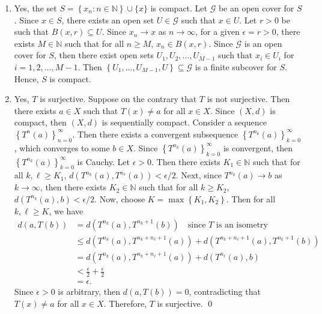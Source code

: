 \documentclass[11pt]{amsart}
\theoremstyle{plain}
\numberwithin{equation}{section}
\begin{document}
\begin{enumerate}[label=\textbf{(\alph*)}]
    \itemsep 0em
    \item Yes, the set $S=\left\{x_{n}:n\in\mathbb{N}\right\}\cup\{x\}$ is compact. Let $\mathcal{G}$ be an open cover for $S$. Since $x\in S$, there exists an open set $U\in\mathcal{G}$ such that $x\in U$. Let $r>0$ be such that $B(x,r)\subseteq U$. Since $x_{n}\to x$ as $n\to\infty$, for a given $\epsilon=r>0$, there exists $M\in\mathbb{N}$ such that for all $n\geq M$, $x_{n}\in B\left(x,r\right)$. Since $\mathcal{G}$ is an open cover for $S$, then there exist open sets $U_{1},U_{2},\dots,U_{M-1}$ such that $x_{i}\in U_{i}$ for $i=1,2,\dots,M-1$. Then $\left\{U_{1},\dots,U_{M-1},U\right\}\subseteq\mathcal{G}$ is a finite subcover for $S$. Hence, $S$ is compact.
    \item Yes, $T$ is surjective. Suppose on the contrary that $T$ is not surjective. Then there exists $a\in X$ such that $T(x)\neq a$ for all $x\in X$. Since $(X,d)$ is compact, then $(X,d)$ is sequentially compact. Consider a sequence $\left\{T^{n}(a)\right\}_{n=0}^{\infty}$. Then there exists a convergent subsequence $\left\{T^{n_{k}}(a)\right\}_{k=0}^{\infty}$, which converges to some $b\in X$. Since $\left\{T^{n_{k}}(a)\right\}_{k=0}^{\infty}$ is convergent, then $\left\{T^{n_{k}}(a)\right\}_{k=0}^{\infty}$ is Cauchy. Let $\epsilon>0$. Then there exists $K_{1}\in\mathbb{N}$ such that for all $k,\ell\geq K_{1}$, $d\left(T^{n_{k}}(a),T^{n_{\ell}}(a)\right)<\epsilon/2$. Next, since $T^{n_{k}}(a)\to b$ as $k\to\infty$, then there exists $K_{2}\in\mathbb{N}$ such that for all $k\geq K_{2}$, $d\left(T^{n_{k}}(a),b\right)<\epsilon/2$. Now, choose $K=\max\left\{K_{1},K_{2}\right\}$. Then for all $k,\ell\geq K$, we have
\begin{align*}
    d\left(a,T(b)\right)&=d\left(T^{n_{k}}(a),T^{n_{k}+1}(b)\right)\quad\text{since }T\text{ is an isometry}
    \\
    &\leq d\left(T^{n_{k}}(a),T^{n_{k}+n_{\ell}+1}(a)\right)+d\left(T^{n_{k}+n_{\ell}+1}(a),T^{n_{k}+1}(b)\right)
    \\
    &=d\left(T^{n_{k}}(a),T^{n_{k}+n_{\ell}+1}(a)\right)+d\left(T^{n_{\ell}}(a),b\right)
    \\
    &<\frac{\epsilon}{2}+\frac{\epsilon}{2}
    \\
    &=\epsilon.
\end{align*}
Since $\epsilon>0$ is arbitrary, then $d\left(a,T(b)\right)=0$, contradicting that $T(x)\neq a$ for all $x\in X$. Therefore, $T$ is surjective. \qed 
\end{enumerate}
\end{document}
